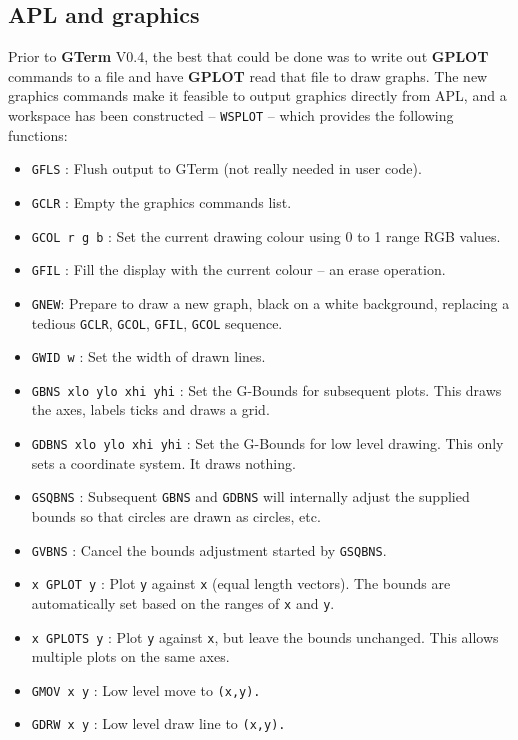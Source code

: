 \documentclass[a4paper,twoside,11pt]{article}
\begin{document}
\subsection{APL and graphics}\label{aplgraf}
Prior to \textbf{GTerm} V0.4, the best that could 
be done was to write out \textbf{GPLOT} commands to a file and have \textbf{GPLOT} read that
file to draw graphs. The new graphics commands make it feasible to output graphics directly from APL,
and a workspace has been constructed -- \texttt{WSPLOT} -- which provides
the following functions:

\begin{itemize}
\item \texttt{GFLS} : Flush output to GTerm (not really needed in user code).
\item \texttt{GCLR} : Empty the graphics commands list.
\item \texttt{GCOL r g b} : Set the current drawing colour using 0 to 1 range RGB values.
\item \texttt{GFIL} : Fill the display with the current colour -- an erase operation.
\item \texttt{GNEW}: Prepare to draw a new graph, black on a white background, replacing a tedious \texttt{GCLR}, \texttt{GCOL}, \texttt{GFIL}, \texttt{GCOL} sequence.
\item \texttt{GWID w} : Set the width of drawn lines.
\item \texttt{GBNS xlo ylo xhi yhi} : Set the G-Bounds for subsequent plots. This draws the axes, labels ticks and draws a grid.
\item \texttt{GDBNS xlo ylo xhi yhi} : Set the G-Bounds for low level drawing. This only sets a coordinate system. It draws nothing.
\item \texttt{GSQBNS} : Subsequent \texttt{GBNS} and \texttt{GDBNS} will internally adjust the supplied bounds so that
circles are drawn as circles, etc.
\item \texttt{GVBNS} : Cancel the bounds adjustment started by \texttt{GSQBNS}.
\item \texttt{x GPLOT y} : Plot \texttt{y} against \texttt{x} (equal length vectors). The bounds are automatically set based on the ranges of \texttt{x} and \texttt{y}.
\item \texttt{x GPLOTS y} : Plot \texttt{y} against \texttt{x}, but leave the bounds unchanged. This allows multiple plots on the same axes.
\item \texttt{GMOV x y} : Low level move to \texttt{(x,y).}
\item \texttt{GDRW x y} : Low level draw line to \texttt{(x,y).}

\end{itemize}
\end{document}
